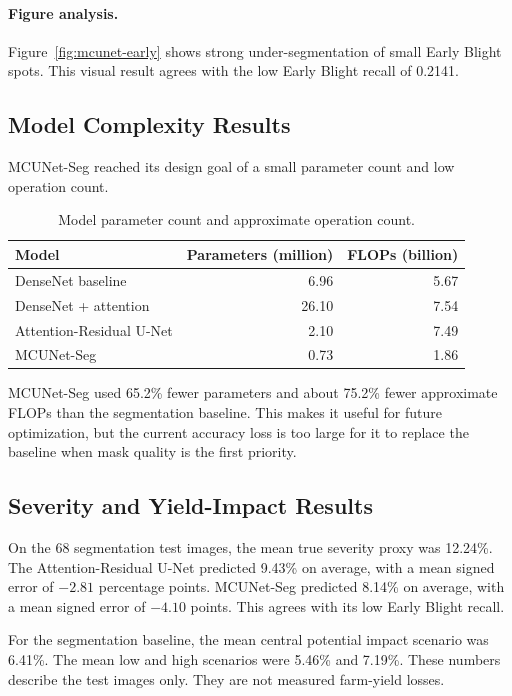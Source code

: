 \documentclass[12pt,a4paper]{article}
\begin{document}
\paragraph{Figure analysis.}
Figure~\ref{fig:mcunet-early} shows strong under-segmentation of small Early Blight
spots. This visual result agrees with the low Early Blight recall of 0.2141.

\subsection{Model Complexity Results}
MCUNet-Seg reached its design goal of a small parameter count and low operation count.

\begin{table}[H]
\centering
\caption{Model parameter count and approximate operation count.}
\label{tab:efficiency}
\small
\begin{tabular}{lrr}
\toprule
Model & Parameters (million) & FLOPs (billion)\\
\midrule
DenseNet baseline & 6.96 & 5.67\\
DenseNet + attention & 26.10 & 7.54\\
Attention-Residual U-Net & 2.10 & 7.49\\
MCUNet-Seg & 0.73 & 1.86\\
\bottomrule
\end{tabular}
\end{table}

MCUNet-Seg used 65.2\% fewer parameters and about 75.2\% fewer approximate FLOPs than
the segmentation baseline. This makes it useful for future optimization, but the current
accuracy loss is too large for it to replace the
baseline when mask quality is the first priority.

\subsection{Severity and Yield-Impact Results}
On the 68 segmentation test images, the mean true severity proxy was 12.24\%. The
Attention-Residual U-Net predicted 9.43\% on average, with a mean signed error of
$-2.81$ percentage points. MCUNet-Seg predicted 8.14\% on average, with a mean signed
error of $-4.10$ points. This agrees with its low Early Blight recall.

For the segmentation baseline, the mean central potential impact scenario was 6.41\%.
The mean low and high scenarios were 5.46\% and 7.19\%. These numbers describe the test
images only. They are not measured farm-yield losses.
\end{document}
